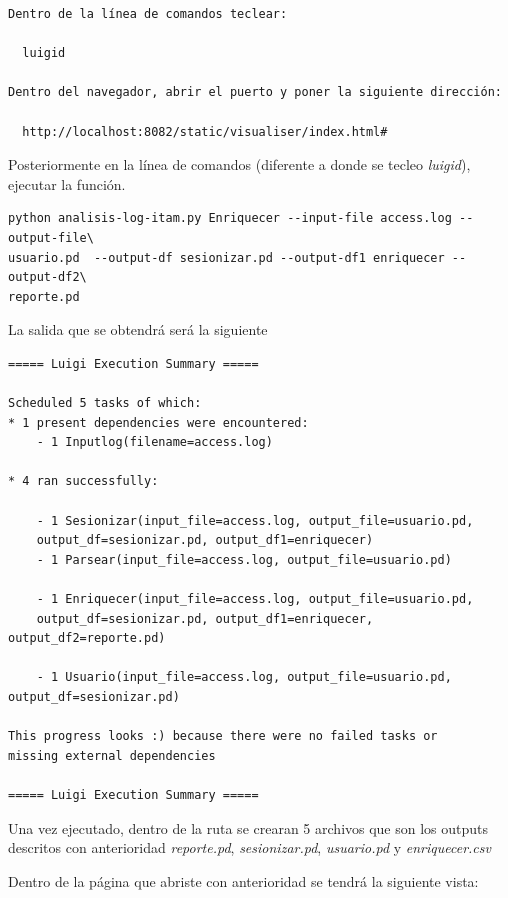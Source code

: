 \documentclass[]{article}
\begin{document}
\begin{verbatim}
Dentro de la línea de comandos teclear:

  luigid

Dentro del navegador, abrir el puerto y poner la siguiente dirección:

  http://localhost:8082/static/visualiser/index.html#
\end{verbatim}

Posteriormente en la línea de comandos (diferente a donde se tecleo
\emph{luigid}), ejecutar la función.

\begin{verbatim}
python analisis-log-itam.py Enriquecer --input-file access.log --output-file\
usuario.pd  --output-df sesionizar.pd --output-df1 enriquecer --output-df2\
reporte.pd
\end{verbatim}

La salida que se obtendrá será la siguiente

\begin{verbatim}
===== Luigi Execution Summary =====

Scheduled 5 tasks of which:
* 1 present dependencies were encountered:
    - 1 Inputlog(filename=access.log)
    
* 4 ran successfully:

    - 1 Sesionizar(input_file=access.log, output_file=usuario.pd,
    output_df=sesionizar.pd, output_df1=enriquecer)
    - 1 Parsear(input_file=access.log, output_file=usuario.pd)
    
    - 1 Enriquecer(input_file=access.log, output_file=usuario.pd,
    output_df=sesionizar.pd, output_df1=enriquecer, output_df2=reporte.pd)
    
    - 1 Usuario(input_file=access.log, output_file=usuario.pd, output_df=sesionizar.pd)

This progress looks :) because there were no failed tasks or
missing external dependencies

===== Luigi Execution Summary =====
\end{verbatim}

Una vez ejecutado, dentro de la ruta se crearan 5 archivos que son los
outputs descritos con anterioridad \emph{reporte.pd},
\emph{sesionizar.pd}, \emph{usuario.pd} y \emph{enriquecer.csv}

Dentro de la página que abriste con anterioridad se tendrá la siguiente
vista:
\end{document}
